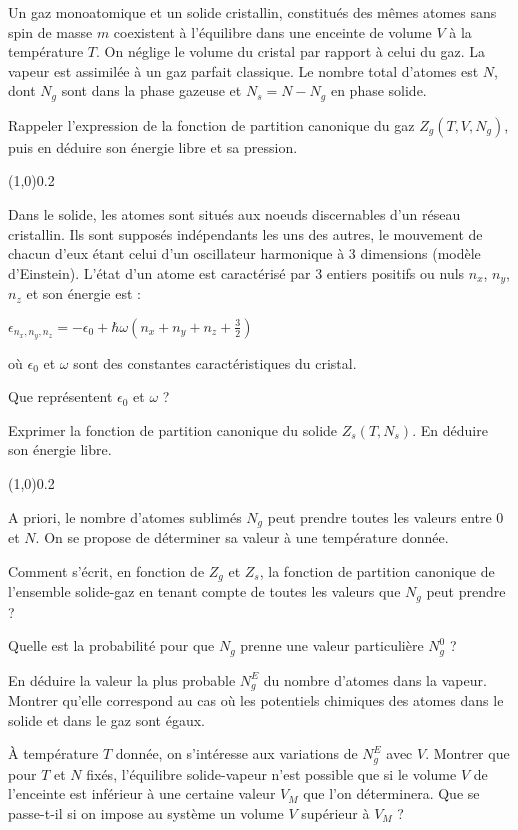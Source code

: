 Un gaz monoatomique et un solide cristallin, constitués des mêmes atomes sans spin de masse $m$ coexistent à l'équilibre dans une enceinte de volume $V$  à la température $T$. On néglige le volume du cristal par rapport à celui du gaz. La vapeur est assimilée à un gaz parfait classique. Le nombre total d’atomes est $N$, dont $N_g$ sont dans la phase gazeuse et $N_s=N-N_g$ en phase solide.

\question Rappeler l'expression de la fonction de partition canonique du gaz $Z_g(T, V, N_g)$, puis en déduire son énergie libre et sa pression. 

\begin{center} \vspace{-0.5cm}\line(1,0){0.2\textwidth} \vspace{-0.5cm}\end{center}

Dans le solide, les atomes sont situés aux noeuds discernables d’un réseau cristallin. Ils sont supposés indépendants
les uns des autres, le mouvement de chacun d’eux étant celui d’un oscillateur harmonique à 3 dimensions
(modèle d’Einstein). L'état d’un atome est caractérisé par 3 entiers positifs ou nuls $n_x$, $n_y$,
$n_z$ et son énergie est :
\begin{center}
$\epsilon_{{n_x,n_y,n_z}}=-\epsilon_0+\hbar \omega ( n_x+n_y+n_z+\frac{3}{2})$
\end{center}
où $\epsilon_0$ et $\omega$ sont des constantes caractéristiques du cristal.

\question Que représentent $\epsilon_0$ et $\omega$ ?

\question Exprimer la fonction de partition canonique du solide $Z_s(T, N_s)$. En déduire son énergie libre.

\begin{center} \vspace{-0.5cm}\line(1,0){0.2\textwidth} \vspace{-0.5cm}\end{center}

A priori, le nombre d’atomes sublimés $N_g$ peut prendre toutes les valeurs entre 0 et $N$. On se propose
de déterminer sa valeur à une température donnée.

\medskip

\question Comment s'écrit, en fonction de $Z_g$ et $Z_s$, la fonction de partition canonique de l'ensemble solide-gaz
en tenant compte de toutes les valeurs que $N_g$ peut prendre ?

\question Quelle est la probabilité pour que $N_g$ prenne une valeur particulière $N_g^0$ ?

\question En déduire la valeur la plus probable $N_g^E$ du nombre d'atomes dans la vapeur. Montrer qu'elle
correspond au cas où les potentiels chimiques des atomes dans le solide et dans le gaz sont égaux.

\question \`A température $T$ donnée, on s'intéresse aux variations de $N_g^E$ avec $V$. Montrer que pour $T$ et $N$ fixés, l'équilibre solide-vapeur n'est possible que si le volume $V$ de l’enceinte est inférieur à une certaine
valeur $V_M$ que l'on déterminera. Que se passe-t-il si on impose au système un volume $V$ supérieur à $V_M$ ?
